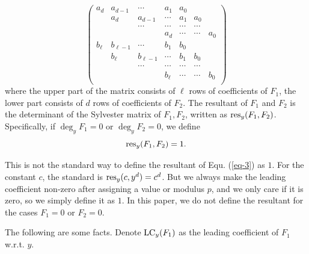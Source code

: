 \documentclass[final,20pt]{elsarticle}
\def\res{\hbox{\rm{res}}}
\def\LC{\hbox{\rm{LC}}}
\begin{document}
\begin{equation}
\left(
  \begin{array}{cccccccc}
    a_d & a_{d-1} & \cdots & a_1 & a_0 &  & \\
        & a_d & a_{d-1} & \cdots & a_1 & a_0 & \\
        &    & \cdots & \cdots & \cdots & \cdots &  \\
     &  &  & a_d & \cdots & \cdots & a_0  \\
    b_{\ell} & b_{\ell-1} & \cdots & b_1 & b_0 &  & \\
        & b_{\ell} & b_{\ell-1} & \cdots & b_1 & b_0 & \\
        &    & \cdots & \cdots & \cdots & \cdots &  \\
     &  &  & b_{\ell} & \cdots & \cdots & b_0  \\
   \end{array}
\right)
\end{equation}
%
where the upper part of the matrix consists of $\ell$ rows of coefficients of $F_1$, the lower part consists of $d$ rows of coefficients of $F_2$.
%
The resultant of $F_1$ and $F_2$ is the determinant of the Sylvester matrix of $F_1,F_2$, written as $\res_y(F_1,F_2)$. Specifically, if $\deg_y F_1=0$ or $\deg_y F_2=0$, we define
\begin{equation}\label{eq-3}
\res_y(F_1,F_2)=1.
\end{equation}



This is not the standard way to define the resultant of Equ. (\ref{eq-3}) as $1$. For the constant $c$, the standard is $\res_y(c,y^d)=c^d$. But we always make the leading coefficient non-zero after assigning a value or modulus $p$, and we only care if it is zero, so we simply define it as $1$. 
%
In this paper, we do not define the resultant for the cases $F_1=0$ or $F_2=0$.



The following are some facts. Denote $\LC_y(F_1)$ as the leading coefficient of $F_1$ w.r.t. $y$.
\end{document}
